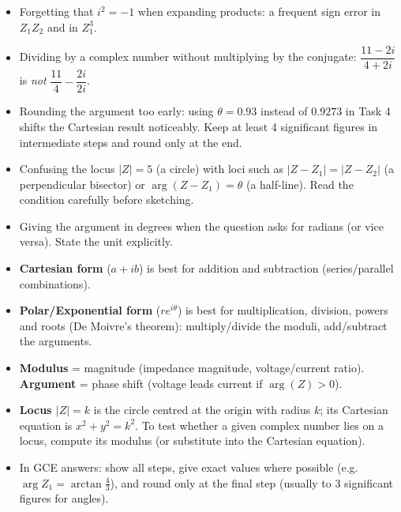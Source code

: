 \documentclass[11pt]{article}
\begin{document}
\begin{attention}
\begin{itemize}
    \item Forgetting that $i^2 = -1$ when expanding products: a frequent sign error in $Z_1 Z_2$ and in $Z_1^3$.
    \item Dividing by a complex number without multiplying by the conjugate: $\dfrac{11-2i}{4+2i}$ is \emph{not} $\dfrac{11}{4} - \dfrac{2i}{2i}$.
    \item Rounding the argument too early: using $\theta = 0.93$ instead of $0.9273$ in Task 4 shifts the Cartesian result noticeably. Keep at least 4 significant figures in intermediate steps and round only at the end.
    \item Confusing the locus $|Z| = 5$ (a circle) with loci such as $|Z - Z_1| = |Z - Z_2|$ (a perpendicular bisector) or $\arg(Z - Z_1) = \theta$ (a half-line). Read the condition carefully before sketching.
    \item Giving the argument in degrees when the question asks for radians (or vice versa). State the unit explicitly.
\end{itemize}
\end{attention}

\begin{aretenir}
\begin{itemize}
    \item \textbf{Cartesian form} ($a+ib$) is best for addition and subtraction (series/parallel combinations).
    \item \textbf{Polar/Exponential form} ($r e^{i\theta}$) is best for multiplication, division, powers and roots (De Moivre's theorem): multiply/divide the moduli, add/subtract the arguments.
    \item \textbf{Modulus} = magnitude (impedance magnitude, voltage/current ratio). \textbf{Argument} = phase shift (voltage leads current if $\arg(Z) > 0$).
    \item \textbf{Locus $|Z| = k$} is the circle centred at the origin with radius $k$; its Cartesian equation is $x^2 + y^2 = k^2$. To test whether a given complex number lies on a locus, compute its modulus (or substitute into the Cartesian equation).
    \item In GCE answers: show all steps, give exact values where possible (e.g. $\arg Z_1 = \arctan\frac{4}{3}$), and round only at the final step (usually to 3 significant figures for angles).
\end{itemize}
\end{aretenir}
\end{document}
